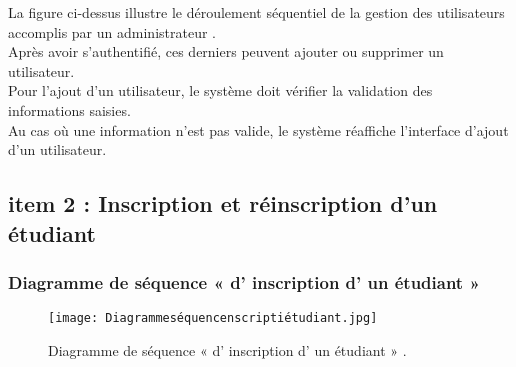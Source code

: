La figure ci-dessus illustre le déroulement séquentiel de la gestion des utilisateurs accomplis par
un administrateur .\\
Après avoir s’authentifié, ces derniers peuvent ajouter ou supprimer un utilisateur.\\
Pour l’ajout d’un utilisateur, le système doit vérifier la validation des informations saisies.\\
 Au cas où une information n’est pas valide, le système réaffiche l’interface d’ajout d’un utilisateur.
\clearpage
\subsection{item 2 : Inscription et réinscription d'un étudiant}
\subsubsection{Diagramme de séquence « d' inscription d' un étudiant » }
\begin{figure}[ht]
	\centering
	\texttt{[image: Diagrammeséquencenscriptiétudiant.jpg]}
	\caption{Diagramme de séquence « d' inscription d' un étudiant » .}
	\label{fig:Diagramme de séquence  d' inscription d' un étudiant   }
\end{figure}
\FloatBarrier


